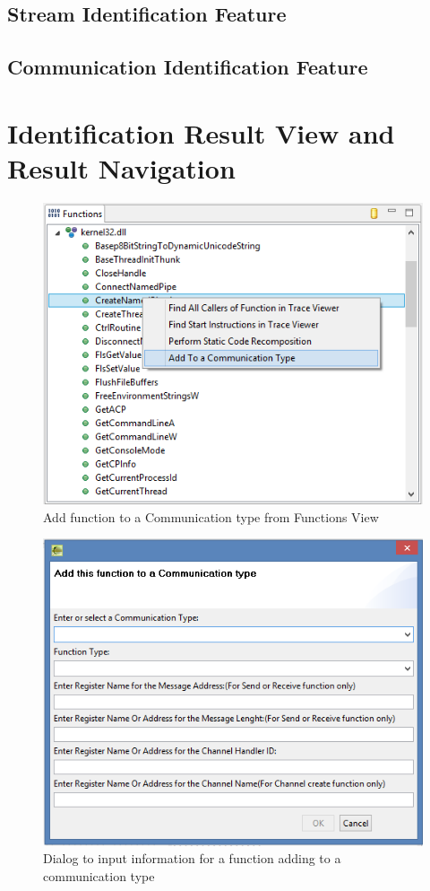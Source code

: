 \subsection{Stream Identification Feature}

\subsection{Communication Identification Feature}

\section{Identification Result View and Result Navigation}


\begin{figure}[h]
\includegraphics{Figures/functionsview}
 \caption{Add function to a Communication type from Functions View}
\label{functionsview}
\end{figure}

\begin{figure}[h]
\includegraphics{Figures/dialog}
 \caption{Dialog to input information for a function adding to a communication type}
\label{dialog}
\end{figure}



